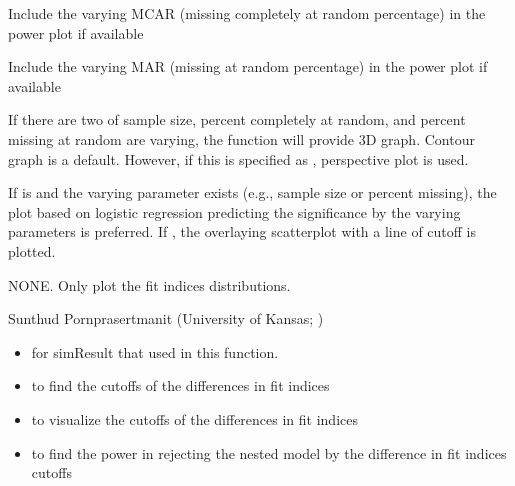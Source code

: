 \documentclass[a4paper]{book}
\begin{document}
\begin{Arguments}
\begin{ldescription}
\item[\code{contMCAR}] 
Include the varying MCAR (missing completely at random percentage) in the power plot if available

\item[\code{contMAR}] 
Include the varying MAR (missing at random percentage) in the power plot if available

\item[\code{useContour}] 
If there are two of sample size, percent completely at random, and percent missing at random are varying, the  function will provide 3D graph. Contour graph is a default. However, if this is specified as , perspective plot is used.

\item[\code{logistic}] 
If  is  and the varying parameter exists (e.g., sample size or percent missing), the plot based on logistic regression predicting the significance by the varying parameters is preferred. If , the overlaying scatterplot with a line of cutoff is plotted.

\end{ldescription}
\end{Arguments}
%
\begin{Value}
NONE. Only plot the fit indices distributions.
\end{Value}
%
\begin{Author}\relax
Sunthud Pornprasertmanit (University of Kansas; )
\end{Author}
%
\begin{SeeAlso}\relax
\begin{itemize}

\item {} for simResult that used in this function.
\item {} to find the cutoffs of the differences in fit indices
\item {} to visualize the cutoffs of the differences in fit indices
\item {} to find the power in rejecting the nested model by the difference in fit indices cutoffs

\end{itemize}

\end{SeeAlso}
%
\end{document}
